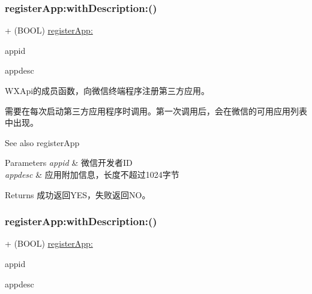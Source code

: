 \subsubsection{\texorpdfstring{register\+App\+:with\+Description\+:()}{registerApp:withDescription:()}\hspace{0.1cm}{\footnotesize\ttfamily [2/3]}}
{\footnotesize\ttfamily + (B\+O\+OL) \mbox{\hyperlink{interface_w_x_api_a84341d7a4aea16c2fd6e74708a569564}{register\+App\+:}} \begin{DoxyParamCaption}\item[{(N\+S\+String $\ast$)}]{appid }\item[{withDescription:(N\+S\+String $\ast$)}]{appdesc }\end{DoxyParamCaption}}



W\+X\+Api的成员函数，向微信终端程序注册第三方应用。 

需要在每次启动第三方应用程序时调用。第一次调用后，会在微信的可用应用列表中出现。 \begin{DoxySeeAlso}{See also}
register\+App 
\end{DoxySeeAlso}

\begin{DoxyParams}{Parameters}
{\em appid} & 微信开发者\+ID \\
\hline
{\em appdesc} & 应用附加信息，长度不超过1024字节 \\
\hline
\end{DoxyParams}
\begin{DoxyReturn}{Returns}
成功返回\+Y\+E\+S，失败返回\+N\+O。 
\end{DoxyReturn}
\mbox{\label{interface_w_x_api_a76af46b7bb7e49aef40476a0dc377472}} 
\subsubsection{\texorpdfstring{register\+App\+:with\+Description\+:()}{registerApp:withDescription:()}\hspace{0.1cm}{\footnotesize\ttfamily [3/3]}}
{\footnotesize\ttfamily + (B\+O\+OL) \mbox{\hyperlink{interface_w_x_api_a84341d7a4aea16c2fd6e74708a569564}{register\+App\+:}} \begin{DoxyParamCaption}\item[{(N\+S\+String $\ast$)}]{appid }\item[{withDescription:(N\+S\+String $\ast$)}]{appdesc }\end{DoxyParamCaption}}



